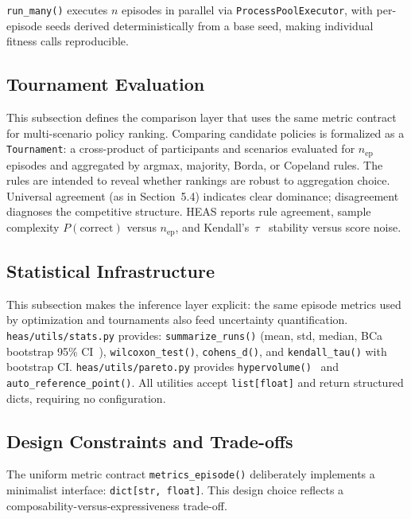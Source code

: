 \documentclass{wscpaperproc}
\begin{document}
\texttt{run\_many()} executes $n$ episodes in parallel via
\texttt{ProcessPoolExecutor}, with per-episode seeds derived deterministically
from a base seed, making individual fitness calls reproducible.

\subsection{Tournament Evaluation}

This subsection defines the comparison layer that uses the same metric contract
for multi-scenario policy ranking. Comparing candidate policies is formalized as a \texttt{Tournament}: a
cross-product of participants and scenarios evaluated for $n_\text{ep}$
episodes and aggregated by argmax, majority, Borda, or Copeland rules. The
rules are intended to reveal whether rankings are robust to aggregation choice.
Universal agreement (as in Section~5.4) indicates clear dominance;
disagreement diagnoses the competitive structure.
HEAS reports rule agreement, sample complexity $P(\text{correct})$ versus
$n_\text{ep}$, and Kendall's~$\tau$~\cite{kendall1938new} stability versus
score noise.

\subsection{Statistical Infrastructure}

This subsection makes the inference layer explicit: the same episode metrics
used by optimization and tournaments also feed uncertainty quantification.
\texttt{heas/utils/stats.py} provides: \texttt{summarize\_runs()} (mean, std,
median, BCa bootstrap 95\% CI~\cite{efron1994bootstrap}),
\texttt{wilcoxon\_test()}, \texttt{cohens\_d()}, and \texttt{kendall\_tau()}
with bootstrap CI. \texttt{heas/utils/pareto.py} provides
\texttt{hypervolume()}~\cite{zitzler1998hypervolume} and
\texttt{auto\_reference\_point()}. All utilities accept \texttt{list[float]}
and return structured dicts, requiring no configuration.

\subsection{Design Constraints and Trade-offs}
\label{sec:design-constraints}

The uniform metric contract \texttt{metrics\_episode()} deliberately implements
a minimalist interface: \texttt{dict[str, float]}. This design choice reflects a
composability-versus-expressiveness trade-off.
\end{document}
